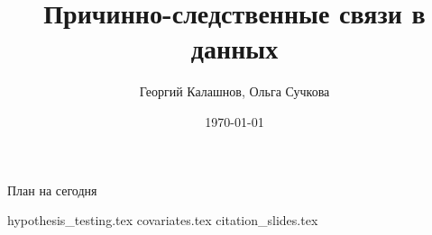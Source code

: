 \documentclass[handout,12pt]{beamer}
\title{Причинно-следственные связи в данных}
\author[Георгий Калашнов, Ольга Сучкова]{Георгий Калашнов, Ольга Сучкова}
\date{\today}
\begin{document}
\begin{frame}
  \titlepage
  \begin{flushright}
  \end{flushright}
\end{frame}


\begin{frame}{План на сегодня} 
\tableofcontents
\end{frame}

{hypothesis_testing.tex}
{covariates.tex}
{citation_slides.tex}
\end{document}
